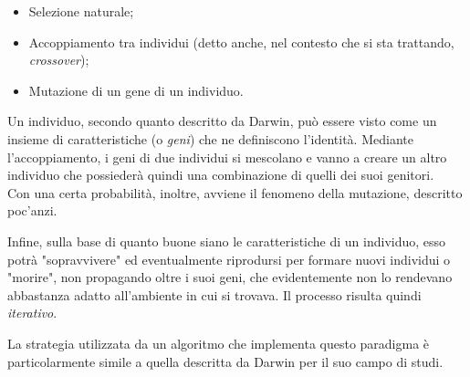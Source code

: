     \begin{itemize}
        \item Selezione naturale;
        \item Accoppiamento tra individui (detto anche, nel contesto che si sta trattando, \textit{crossover});
        \item Mutazione di un gene di un individuo.
    \end{itemize}

    Un individuo, secondo quanto descritto da Darwin, può essere visto come un insieme di caratteristiche (o \textit{geni}) che ne definiscono l'identità. Mediante l'accoppiamento, i geni di due individui si mescolano e vanno a creare un altro individuo che possiederà quindi una combinazione di quelli dei suoi genitori. \\
    Con una certa probabilità, inoltre, avviene il fenomeno della mutazione, descritto poc'anzi.

    Infine, sulla base di quanto buone siano le caratteristiche di un individuo, esso potrà "sopravvivere" ed eventualmente riprodursi per formare nuovi individui o "morire", non propagando oltre i suoi geni, che evidentemente non lo rendevano abbastanza adatto all'ambiente in cui si trovava. Il processo risulta quindi \textit{iterativo}.

    La strategia utilizzata da un algoritmo che implementa questo paradigma è particolarmente simile a quella descritta da Darwin per il suo campo di studi.

